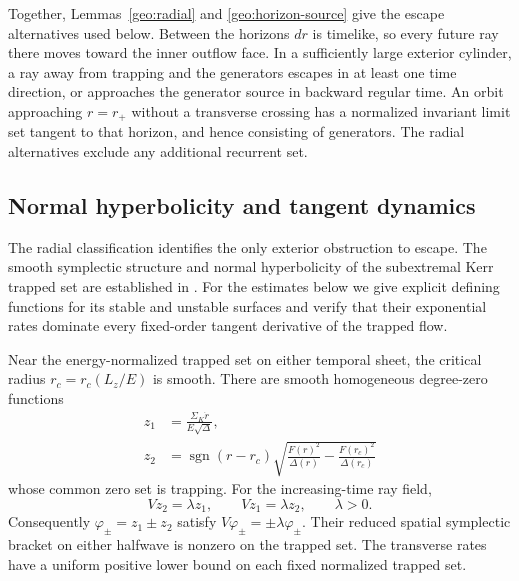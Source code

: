 Together, Lemmas~\ref{geo:radial} and \ref{geo:horizon-source} give the
escape alternatives used below.  Between the horizons $dr$ is timelike,
so every future ray there moves toward the inner outflow face.  In a
sufficiently large exterior cylinder, a ray away from trapping and the
generators escapes in at least one time direction, or approaches the
generator source in backward regular time.  An orbit approaching
$r=r_+$ without a transverse crossing has a normalized invariant limit
set tangent to that horizon, and hence consisting of generators.
The radial alternatives exclude any additional recurrent set.

\subsection{Normal hyperbolicity and tangent dynamics}

The radial classification identifies the only exterior obstruction to
escape.  The smooth symplectic structure and normal hyperbolicity of
the subextremal Kerr trapped set are established in
\cite[Section~II]{DyatlovZworski2013}.  For the estimates below we give
explicit defining functions for its stable and unstable surfaces and
verify that their exponential rates dominate every fixed-order
tangent derivative of the trapped flow.

\begin{lemma}
\label{geo:normal-functions}
Near the energy-normalized trapped set on either temporal sheet, the
critical radius $r_c=r_c(L_z/E)$ is smooth.  There are smooth homogeneous
degree-zero functions
\begin{equation}
 \begin{aligned}
 z_1&=\frac{\Sigma_K\dot r}{E\sqrt\Delta},\\
 z_2&=\operatorname{sgn}(r-r_c)
       \sqrt{\frac{F(r)^2}{\Delta(r)}
                  -\frac{F(r_c)^2}{\Delta(r_c)}}
 \end{aligned}
 \label{geo:normal-variables}
\end{equation}
whose common zero set is trapping.  For the increasing-time ray field,
\begin{equation}
 Vz_2=\lambda z_1,\qquad Vz_1=\lambda z_2,
       \qquad \lambda>0.
 \label{geo:normal-system}
\end{equation}
Consequently $\varphi_\pm=z_1\pm z_2$ satisfy
$V\varphi_\pm=\pm\lambda\varphi_\pm$.  Their reduced spatial
symplectic bracket on either halfwave is nonzero on the trapped set.
The transverse rates have a uniform positive lower bound on each
fixed normalized trapped set.
\end{lemma}

